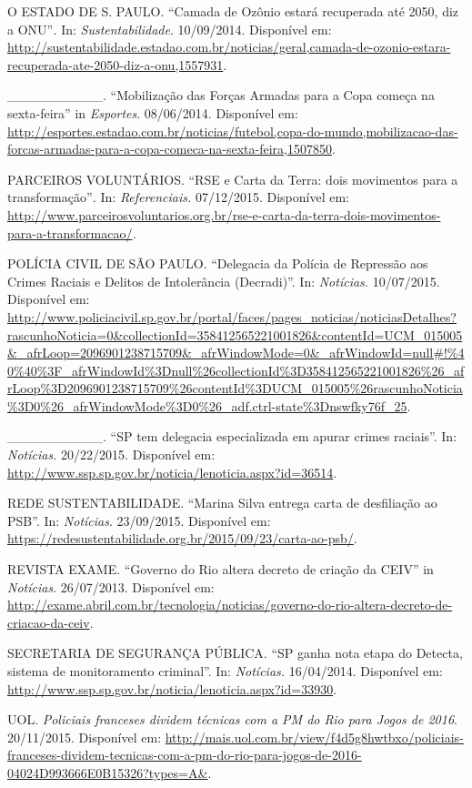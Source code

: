 O ESTADO DE S. PAULO. ``Camada de Ozônio estará recuperada até 2050, diz
a ONU''\emph{.} In: \emph{Sustentabilidade}. 10/09/2014. Disponível em:
\url{http://sustentabilidade.estadao.com.br/noticias/geral,camada-de-ozonio-estara-recuperada-ate-2050-diz-a-onu,1557931}.

\_\_\_\_\_\_\_\_\_\_. ``Mobilização das Forças Armadas para a Copa
começa na sexta-feira'' in \emph{Esportes}. 08/06/2014. Disponível em:
\url{http://esportes.estadao.com.br/noticias/futebol,copa-do-mundo,mobilizacao-das-forcas-armadas-para-a-copa-comeca-na-sexta-feira,1507850}.

PARCEIROS VOLUNTÁRIOS. ``RSE e Carta da Terra: dois movimentos para a
transformação''\emph{.} In: \emph{Referenciais.} 07/12/2015. Disponível
em:
\url{http://www.parceirosvoluntarios.org.br/rse-e-carta-da-terra-dois-movimentos-para-a-transformacao/}\emph{.}

POLÍCIA CIVIL DE SÃO PAULO. ``Delegacia da Polícia de Repressão aos
Crimes Raciais e Delitos de Intolerância (Decradi)''. In:
\emph{Notícias.} 10/07/2015. Disponível em:
\url{http://www.policiacivil.sp.gov.br/portal/faces/pages_noticias/noticiasDetalhes?rascunhoNoticia=0\&collectionId=358412565221001826\&contentId=UCM_015005\&_afrLoop=2096901238715709\&_afrWindowMode=0\&_afrWindowId=null\#!\%40\%40\%3F_afrWindowId\%3Dnull\%26collectionId\%3D358412565221001826\%26_afrLoop\%3D2096901238715709\%26contentId\%3DUCM_015005\%26rascunhoNoticia\%3D0\%26_afrWindowMode\%3D0\%26_adf.ctrl-state\%3Dnswfky76f_25}.

\_\_\_\_\_\_\_\_\_\_. ``SP tem delegacia especializada em apurar crimes
raciais''. In: \emph{Notícias.} 20/22/2015. Disponível em:
\url{http://www.ssp.sp.gov.br/noticia/lenoticia.aspx?id=36514}.

REDE SUSTENTABILIDADE. ``Marina Silva entrega carta de desfiliação ao
PSB''. In: \emph{Notícias}. 23/09/2015. Disponível em:
\url{https://redesustentabilidade.org.br/2015/09/23/carta-ao-psb/}.

REVISTA EXAME. ``Governo do Rio altera decreto de criação da CEIV'' in
\emph{Notícias}. 26/07/2013. Disponível em:
\url{http://exame.abril.com.br/tecnologia/noticias/governo-do-rio-altera-decreto-de-criacao-da-ceiv}.

SECRETARIA DE SEGURANÇA PÚBLICA. ``SP ganha nota etapa do Detecta,
sistema de monitoramento criminal''. In: \emph{Notícias.} 16/04/2014.
Disponível em:
\url{http://www.ssp.sp.gov.br/noticia/lenoticia.aspx?id=33930}.

UOL. \emph{Policiais franceses dividem técnicas com a PM do Rio para
Jogos de 2016}. 20/11/2015. Disponível em:
\url{http://mais.uol.com.br/view/f4d5g8hwtbxo/policiais-franceses-dividem-tecnicas-com-a-pm-do-rio-para-jogos-de-2016-04024D993666E0B15326?types=A\&}.


